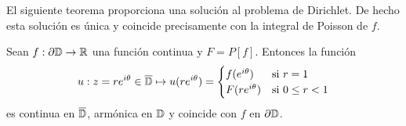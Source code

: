 El siguiente teorema proporciona una solución al problema de Dirichlet. De hecho esta solución es única y coincide precisamente con la integral de Poisson de $f$. \\

\begin{theorem} %
    \label{th:fatouaux2}
    Sean $f:\partial \mathbb{D} \to \mathbb{R}$ una función continua y $F = P[f]$. Entonces la función
    \begin{equation*}
        u : z = re^{i \theta} \in \overline{\mathbb{D}} \mapsto u(re^{i \theta}) =
        \begin{cases}
            f(e^{i\theta}) & \text{si } r=1 \\
            F(re^{i\theta}) & \text{si } 0 \leq r<1
        \end{cases}
    \end{equation*}
    es continua en $\overline{\mathbb{D}}$, armónica en $\mathbb{D}$ y coincide con $f$ en $\partial \mathbb{D}$.
\end{theorem}

